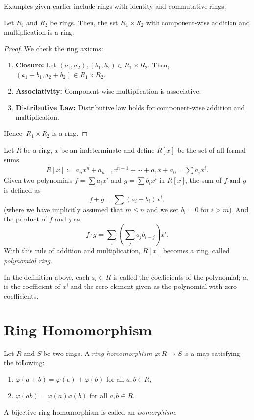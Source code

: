 Examples given earlier include rings with identity and commutative rings.

\begin{eg}\label{eg:directprod}
    Let $R_1$ and $R_2$ be rings. Then, the set $R_1 \times R_2$ with component-wise addition and multiplication is a ring.
\end{eg}
\begin{proof}
    We check the ring axioms:
    \begin{enumerate}
        \item \textbf{Closure:} Let $(a_1, a_2), (b_1, b_2) \in R_1 \times R_2$. Then, $(a_1 + b_1, a_2 + b_2) \in R_1 \times R_2$.
        \item \textbf{Associativity:} Component-wise multiplication is associative.
        \item \textbf{Distributive Law:} Distributive law holds for component-wise addition and multiplication.
    \end{enumerate}
    Hence, $R_1 \times R_2$ is a ring.
\end{proof}

\begin{definition}\label{def:polyring}
    Let $R$ be a ring, $x$ be an indeterminate and define $R[x]$ be the set of all formal sums
    \begin{align*}
        R[x] := a_nx^n + a_{n-1}x^{n-1} + \cdots + a_1x + a_0 = \sum a_ix^i.
    \end{align*}
    Given two polynomials $f = \sum a_ix^i$ and $g = \sum b_ix^i$ in $R[x]$, the sum of $f$ and $g$ is defined as
        \[f + g = \sum (a_i + b_i)x^i,\]
    (where we have implicitly assumed that $m \leq n$ and we set $b_i = 0$ for $i > m$).
    And the product of $f$ and $g$ as
    \[f \cdot g = \sum_{i}^{}(\sum_{j}^{}a_jb_{i-j})x^i.\]
    With this rule of addition and multiplication, $R[x]$ becomes a ring, called \textit{polynomial ring}. 
\end{definition}
In the definition above, each $a_i \in R$ is called the coefficients of the polynomial; $a_i$ is the coefficient of $x^i$ and the zero element given as the polynomial with zero coefficients.

\section{Ring Homomorphism}
\begin{definition}
    Let $R$ and $S$ be two rings. A \textit{ring homomorphism} $\varphi: R \rightarrow S$ is a map satisfying the following:
    \begin{enumerate}
        \item $\varphi(a + b)  = \varphi(a)+ \varphi(b)$ for all $a, b \in R$,
        \item $\varphi(a b)  = \varphi(a)\varphi(b)$ for all $a, b \in R$.
    \end{enumerate}
\end{definition}
\begin{definition}[Isomorphism]
    A bijective ring homomorphism is called an \textit{isomorphism}.
\end{definition}


